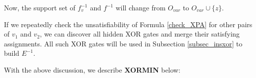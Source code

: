 \documentclass[journal]{IEEEtran}
\begin{document}
Now,
the support set of $f^{-1}_v$ and $f^{-1}$ will change from $O_{var}$ to $O_{var}\cup \{z\}$.

If we repeatedly check the unsatisfiability of Formula \ref{check_XPA} for other pairs of $v_1$ and $v_2$,
we can discover all hidden XOR gates and merge their satisfying assignments.
All such XOR gates will be used in Subsection \ref{subsec_insxor} to build $E^{-1}$.

%

With the above discussion,
we describe \textbf{XORMIN} below:

\vspace{0.2cm}
\end{document}
